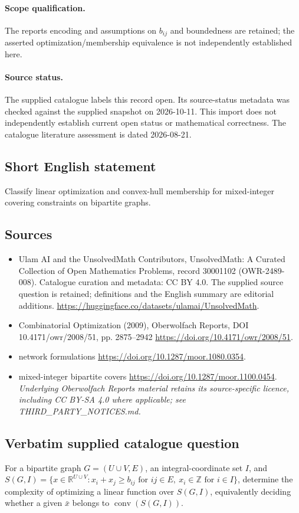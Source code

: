\documentclass[11pt]{article}
\begin{document}
\paragraph{Scope qualification.}
The report\textquotesingle s encoding and assumptions on $b_{ij}$ and boundedness are retained; the asserted optimization/membership equivalence is not independently established here.
\paragraph{Source status.}
The supplied catalogue labels this record open. Its source-status metadata was checked against the supplied snapshot on 2026-10-11. This import does not independently establish current open status or mathematical correctness. The catalogue literature assessment is dated 2026-08-21.
\subsection{Short English statement}
Classify linear optimization and convex-hull membership for mixed-integer covering constraints on bipartite graphs.
\subsection{Sources}
\begin{itemize}
\item[S1] Ulam AI and the UnsolvedMath Contributors, UnsolvedMath: A Curated Collection of Open Mathematics Problems, record 30001102 (OWR-2489-008). Catalogue curation and metadata: CC BY 4.0. The supplied source question is retained; definitions and the English summary are editorial additions.
\url{https://huggingface.co/datasets/ulamai/UnsolvedMath}.
\item[S2] Combinatorial Optimization (2009), Oberwolfach Reports, DOI 10.4171/owr/2008/51, pp. 2875--2942
\url{https://doi.org/10.4171/owr/2008/51}.
\item[S3] network formulations
\url{https://doi.org/10.1287/moor.1080.0354}.
\item[S4] mixed-integer bipartite covers
\url{https://doi.org/10.1287/moor.1100.0454}.
\textit{Underlying Oberwolfach Reports material retains its source-specific licence, including CC BY-SA 4.0 where applicable; see THIRD\_PARTY\_NOTICES.md.}
\end{itemize}
\subsection{Verbatim supplied catalogue question}
For a bipartite graph $G=(U\cup V,E)$, an integral-coordinate set $I$, and $S(G,I)=\{x\in\mathbb{R}^{U\cup V}:x_i+x_j\geq b_{ij}\text{ for }ij\in E,\ x_i\in\mathbb{Z}\text{ for }i\in I\}$, determine the complexity of optimizing a linear function over $S(G,I)$, equivalently deciding whether a given $\bar{x}$ belongs to $\operatorname{conv}(S(G,I))$.
\end{document}
